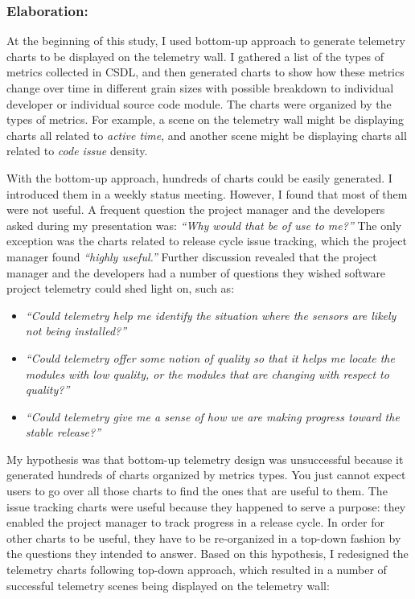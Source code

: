 \subsubsection{Elaboration:}

At the beginning of this study, I used bottom-up approach to generate telemetry charts to be displayed on the telemetry wall. I gathered a list of the types of metrics collected in CSDL, and then generated charts to show how these metrics change over time in different grain sizes with possible breakdown to individual developer or individual source code module. The charts were organized by the types of metrics. For example, a scene on the telemetry wall might be displaying charts all related to \textit{active time}, and another scene might be displaying charts all related to \textit{code issue} density.

With the bottom-up approach, hundreds of charts could be easily generated. I introduced them in a weekly status meeting. However, I found that most of them were not useful. 
A frequent question the project manager and the developers asked during my presentation was: \textit{``Why would that be of use to me?''} The only exception was the charts related to release cycle issue tracking, which the project manager found \textit{``highly useful.''}
Further discussion revealed that the project manager and the developers had a number of questions they wished software project telemetry could shed light on, such as:
\begin{itemize}
	\item \textit{``Could telemetry help me identify the situation where the sensors are likely not being installed?''}
	\item \textit{``Could telemetry offer some notion of quality so that it helps me locate the modules with low quality, or the modules that are changing with respect to quality?''}
	\item \textit{``Could telemetry give me a sense of how we are making progress toward the stable release?''}
\end{itemize}

My hypothesis was that bottom-up telemetry design was unsuccessful because it generated hundreds of charts organized by metrics types. You just cannot expect users to go over all those charts to find the ones that are useful to them. The issue tracking charts were useful because they happened to serve a purpose: they enabled the project manager to track progress in a release cycle. In order for other charts to be useful, they have to be re-organized in a top-down fashion by the questions they intended to answer. 
Based on this hypothesis, I redesigned the telemetry charts following top-down approach, which resulted in a number of successful telemetry scenes being displayed on the telemetry wall:

